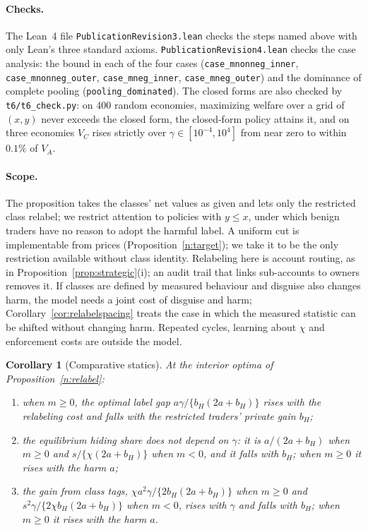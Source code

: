 \documentclass[12pt]{article}
\newtheorem{corollary}[theorem]{Corollary}
\theoremstyle{definition}
\theoremstyle{remark}
\begin{document}
\paragraph{Checks.} The Lean~4 file \nolinkurl{PublicationRevision3.lean} checks the steps named above with only Lean's three standard axioms. \nolinkurl{PublicationRevision4.lean} checks the case analysis: the bound in each of the four cases (\nolinkurl{case_mnonneg_inner}, \nolinkurl{case_mnonneg_outer}, \nolinkurl{case_mneg_inner}, \nolinkurl{case_mneg_outer}) and the dominance of complete pooling (\nolinkurl{pooling_dominated}). The closed forms are also checked by \nolinkurl{t6/t6_check.py}: on 400 random economies, maximizing welfare over a grid of $(x,y)$ never exceeds the closed form, the closed-form policy attains it, and on three economies $V_C$ rises strictly over $\gamma\in[10^{-4},10^4]$ from near zero to within $0.1\%$ of $V_A$.

\paragraph{Scope.} The proposition takes the classes' net values as given and lets only the restricted class relabel; we restrict attention to policies with $y\le x$, under which benign traders have no reason to adopt the harmful label. A uniform cut is implementable from prices (Proposition~\ref{n:target}); we take it to be the only restriction available without class identity. Relabeling here is account routing, as in Proposition~\ref{prop:strategic}(i); an audit trail that links sub-accounts to owners removes it. If classes are defined by measured behaviour and disguise also changes harm, the model needs a joint cost of disguise and harm; Corollary~\ref{cor:relabelspacing} treats the case in which the measured statistic can be shifted without changing harm. Repeated cycles, learning about $\chi$ and enforcement costs are outside the model.

\begin{corollary}[Comparative statics]\label{cor:relabelstatics}
At the interior optima of Proposition~\ref{n:relabel}:
\begin{enumerate}[label=(\roman*),itemsep=1pt]
\item when $m\ge0$, the optimal label gap $a\gamma/\{b_H(2a+b_H)\}$ rises with the relabeling cost and falls with the restricted traders' private gain $b_H$;
\item the equilibrium hiding share does not depend on $\gamma$: it is $a/(2a+b_H)$ when $m\ge0$ and $s/\{\chi(2a+b_H)\}$ when $m<0$, and it falls with $b_H$; when $m\ge0$ it rises with the harm $a$;
\item the gain from class tags, $\chi a^2\gamma/\{2b_H(2a+b_H)\}$ when $m\ge0$ and $s^2\gamma/\{2\chi b_H(2a+b_H)\}$ when $m<0$, rises with $\gamma$ and falls with $b_H$; when $m\ge0$ it rises with the harm $a$.
\end{enumerate}
\end{corollary}
\end{document}

